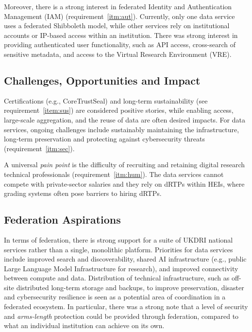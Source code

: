 \documentclass[11pt]{scrartcl}
\begin{document}
Moreover, there is a strong interest in federated Identity and Authentication Management (IAM) (requirement~\ref{itm:aut}). Currently, only one data service uses a federated Shibboleth model, while other services rely on institutional accounts or IP-based access within an institution. There was strong interest in providing authenticated user functionality, such as API access, cross-search of sensitive metadata, and access to the Virtual Research Environment (VRE).

\subsection{Challenges, Opportunities and Impact}
Certifications (e.g., CoreTrustSeal) and long-term sustainability (see requirement~\ref{item:sus}) are considered positive stories, while enabling access, large-scale aggregation, and the reuse of data are often desired impacts.  For data services, ongoing challenges include sustainably maintaining the infrastructure, long-term preservation and protecting against cybersecurity threats (requirement~\ref{itm:sec}).

A universal \emph{pain point} is the difficulty of recruiting and retaining digital research technical professionals (requirement~\ref{itm:hum}). The data services cannot compete with private-sector salaries and they rely on dRTPs within HEIs, where grading systems often pose barriers to hiring dRTPs. 

\subsection{Federation Aspirations}
In terms of federation, there is strong support for a suite of UKDRI national services rather than a single, monolithic platform. Priorities for data services include improved search and discoverability, shared AI infrastructure (e.g., public Large Language Model Infrastructure for research), and improved connectivity between compute and data. Distribution of technical infrastructure, such as off-site distributed long-term storage and backups, to improve preservation, disaster and cybersecurity resilience is seen as a potential area of coordination in a federated ecosystem.
In particular, there was a strong note that a level of security and \emph{arms-length} protection could be provided through federation, compared to what an individual institution can achieve on its own. 
\end{document}
